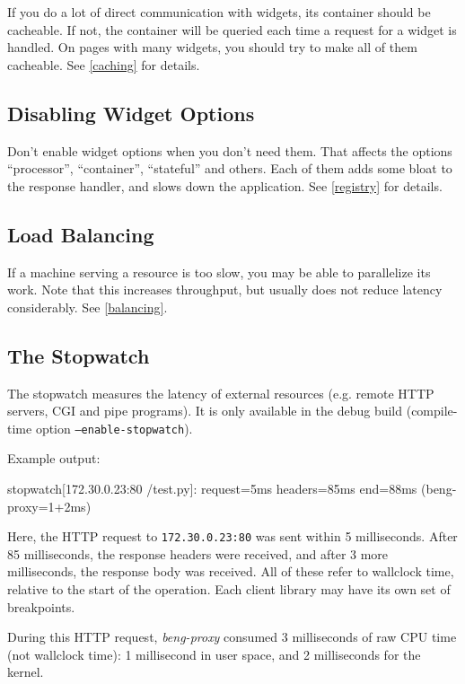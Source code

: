 \documentclass[a4paper,12pt]{article}
\begin{document}
If you do a lot of direct communication with widgets, its container
should be cacheable.  If not, the container will be queried each time
a request for a widget is handled.  On pages with many widgets, you
should try to make all of them cacheable.  See \ref{caching} for
details.

\subsection{Disabling Widget Options}

Don't enable widget options when you don't need them.  That affects
the options ``processor'', ``container'', ``stateful'' and others.
Each of them adds some bloat to the response handler, and slows down
the application.  See \ref{registry} for details.

\subsection{Load Balancing}

If a machine serving a resource is too slow, you may be able to
parallelize its work.  Note that this increases throughput, but
usually does not reduce latency considerably.  See \ref{balancing}.

\subsection{The Stopwatch}
\label{stopwatch}

The stopwatch measures the latency of external resources (e.g. remote
HTTP servers, CGI and pipe programs).  It is only available in the
debug build (compile-time option \texttt{--enable-stopwatch}).

Example output:

\begin{verbatim*}
stopwatch[172.30.0.23:80 /test.py]: request=5ms headers=85ms
end=88ms (beng-proxy=1+2ms)
\end{verbatim*}

Here, the HTTP request to \texttt{172.30.0.23:80} was sent within 5
milliseconds.  After 85 milliseconds, the response headers were
received, and after 3 more milliseconds, the response body was
received.  All of these refer to wallclock time, relative to the start
of the operation.  Each client library may have its own set of
breakpoints.

During this HTTP request, \emph{beng-proxy} consumed 3 milliseconds of
raw CPU time (not wallclock time): 1 millisecond in user space, and 2
milliseconds for the kernel.
\end{document}
